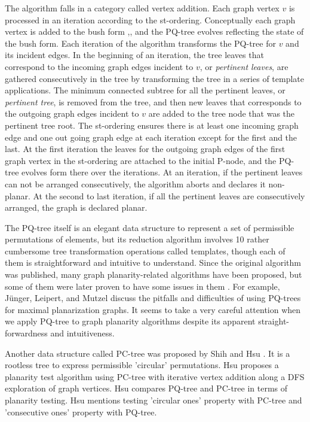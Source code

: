 \documentclass[a4]{jgaa-art}
\begin{document}
The algorithm falls in a category called vertex addition.
Each graph vertex $v$ is processed in an iteration according to the st-ordering.
Conceptually each graph vertex is added to the bush form \cite{LEC67},\cite{EVEN79}, and the PQ-tree
evolves reflecting the state of the bush form.
Each iteration of the algorithm transforms the PQ-tree for $v$
 and its incident edges.
In the beginning of an iteration, the tree leaves that correspond to the incoming graph edges incident to $v$,
or {\it pertinent leaves}, are gathered consecutively in the tree by transforming the tree 
in a series of template applications.
The minimum connected subtree for all the pertinent leaves, or {\it pertinent tree}, is removed from the tree, 
and then new leaves that corresponds to the outgoing graph edges incident to $v$ are added to the tree node 
that was the pertinent tree root.
The st-ordering ensures there is at least one incoming graph edge and one out going graph edge at 
each iteration except for the first and the last. 
At the first iteration the leaves for the outgoing graph edges of the first graph vertex in the st-ordering
are attached to the initial P-node, and the PQ-tree evolves form there over the iterations.
At an iteration, if the pertinent leaves can not be arranged consecutively, the algorithm aborts and declares it
non-planar.
At the second to last iteration, if all the pertinent leaves are consecutively arranged, the graph is declared planar.

The PQ-tree itself is an elegant data structure to represent a set of permissible permutations of elements, 
but its reduction algorithm involves 10 rather cumbersome tree transformation operations called templates, though
each of them is straightforward and intuitive to understand.
Since the original algorithm was published, many graph planarity-related algorithms have been proposed,
 but some of them were later proven to have some issues in them \cite{OZAWA81} \cite{JTS89} \cite{KANT92}.
For example, J\"unger, Leipert, and Mutzel \cite{JUNGER97} discuss the pitfalls and difficulties of using 
PQ-trees for maximal planarization graphs.
It seems to take a very careful attention when we apply PQ-tree to graph planarity algorithms despite its apparent 
straight-forwardness and intuitiveness.

Another data structure called PC-tree was proposed by Shih and Hsu \cite{HSU99}.
It is a rootless tree to express permissible 'circular' permutations. 
Hsu \cite{HSU99} proposes a planarity test algorithm using PC-tree with iterative vertex
 addition along a DFS exploration of graph vertices.
Hsu \cite{HSU01} compares PQ-tree and PC-tree in terms of planarity testing. 
Hsu\cite{HSU01} mentions testing 'circular ones' property with PC-tree and 
'consecutive ones' property with PQ-tree.
\end{document}
